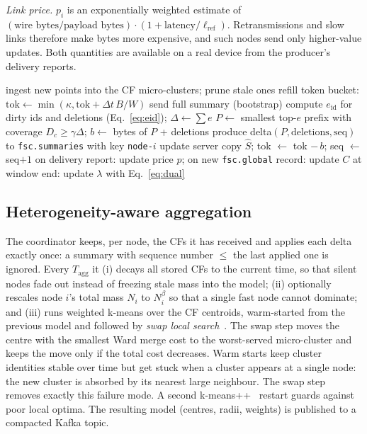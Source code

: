 \emph{Link price.} $p_i$ is an exponentially weighted estimate of $(\text{wire bytes}/\text{payload bytes})\cdot(1+\text{latency}/\ell_\text{ref})$. Retransmissions and slow links therefore make bytes more expensive, and such nodes send only higher-value updates. Both quantities are available on a real device from the producer's delivery reports.

\begin{algorithm}[t]
\caption{FedCAST edge node $i$ (one tick at time $t$)}\label{alg:edge}
\small
\begin{algorithmic}[1]
\State ingest new points into the CF micro-clusters; prune stale ones
\State refill token bucket: $\text{tok}\gets\min(\kappa,\text{tok}+\Delta t\,B/W)$
 send full summary (bootstrap) \EndIf
\State compute $e_{\mathrm{id}}$ for dirty ids and deletions (Eq.~\ref{eq:eid}); $\Delta\gets\sum e$
\State $P\gets$ smallest top-$e$ prefix with coverage $D_c\ge\gamma\Delta$; $b\gets$ bytes of $P$ + deletions
  \State produce delta$(P,\text{deletions},\text{seq})$ to \texttt{fsc.summaries} with key \texttt{node-}$i$
  \State update server copy $\hat S$; tok $\gets$ tok $-\,b$; seq $\gets$ seq$+1$
\EndIf
\State on delivery report: update price $p$; on new \texttt{fsc.global} record: update $C$
\State at window end: update $\lambda$ with Eq.~\eqref{eq:dual}
\end{algorithmic}
\end{algorithm}

\subsection{Heterogeneity-aware aggregation}
The coordinator keeps, per node, the CFs it has received and applies each delta exactly once: a summary with sequence number $\le$ the last applied one is ignored. Every $T_\text{agg}$ it (i) decays all stored CFs to the current time, so that silent nodes fade out instead of freezing stale mass into the model; (ii) optionally rescales node $i$'s total mass $N_i$ to $N_i^\beta$ so that a single fast node cannot dominate; and (iii) runs weighted k-means over the CF centroids, warm-started from the previous model and followed by \emph{swap local search}~\cite{kanungo2004local}. The swap step moves the centre with the smallest Ward merge cost to the worst-served micro-cluster and keeps the move only if the total cost decreases. Warm starts keep cluster identities stable over time but get stuck when a cluster appears at a single node: the new cluster is absorbed by its nearest large neighbour. The swap step removes exactly this failure mode. A second k-means++~\cite{arthur2007kmeanspp} restart guards against poor local optima. The resulting model (centres, radii, weights) is published to a compacted Kafka topic.


